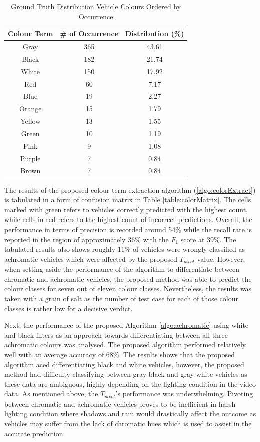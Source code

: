 \begin{table}[bht!]
\centering
\caption{Ground Truth Distribution Vehicle Colours Ordered by Occurrence}
\label{table:colorDist}
\begin{tabular}{ccc}
\toprule
Colour Term & \# of Occurrence & Distribution (\%)   \\
\midrule
Gray       & 365       & 43.61  \\
Black      & 182       & 21.74  \\
White      & 150       & 17.92  \\
Red        & 60        & 7.17   \\
Blue       & 19        & 2.27   \\
Orange     & 15        & 1.79   \\
Yellow     & 13        & 1.55   \\
Green      & 10        & 1.19   \\
Pink       & 9         & 1.08   \\
Purple     & 7         & 0.84   \\
Brown      & 7         & 0.84   \\
\bottomrule
\end{tabular}
\end{table}


The results of the proposed colour term extraction algorithm (\ref{algo:colorExtract}) is tabulated in a form of confusion matrix in Table \ref{table:colorMatrix}. The cells marked with green refers to vehicles correctly predicted with the highest count, while cells in red refers to the highest count of incorrect predictions. Overall, the performance in terms of precision is recorded around 54\% while the recall rate is reported in the region of approximately 36\% with the $F_1$ score at 39\%.
The tabulated results also shows roughly 11\% of vehicles were wrongly classified as achromatic vehicles which were affected by the proposed $T_{pivot}$ value. However, when setting aside the performance of the algorithm to differentiate between chromatic and achromatic vehicles, the proposed method was able to predict the colour classes for seven out of eleven colour classes. Nevertheless, the results was taken with a grain of salt as the number of test case for each of those colour classes is rather low for a decisive verdict.

Next, the performance of the proposed Algorithm \ref{algo:achromatic} using white and black filters as an approach towards differentiating between all three achromatic colours was analysed. The proposed algorithm performed relatively well with an average accuracy of 68\%. The results shows that the proposed algorithm aced differentiating black and white vehicles, however, the proposed method had difficulty classifying between gray-black and gray-white vehicles as these data are ambiguous, highly depending on the lighting condition in the video data.
As mentioned above, the $T_{pivot}$'s performance was underwhelming. Pivoting between chromatic and achromatic vehicles proves to be inefficient in harsh lighting condition where shadows and rain would drastically affect the outcome as vehicles may suffer from the lack of chromatic hues which is used to assist in the accurate prediction.

